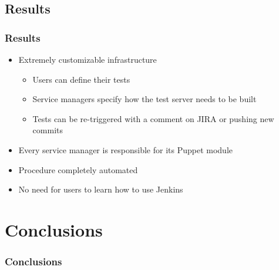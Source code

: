 \documentclass[aspectratio=169]{beamer}
\begin{document}

\subsection{Results}
\begin{frame}
    \frametitle{Results}
    \begin{itemize}
        \item Extremely customizable infrastructure
        \begin{itemize}
            \item Users can define their tests
            \item Service managers specify how the test server needs to be built
            \item Tests can be re-triggered with a comment on JIRA or pushing new commits
        \end{itemize}
        \item Every service manager is responsible for its Puppet module
        \item Procedure completely automated
        \item No need for users to learn how to use Jenkins
    \end{itemize}
\end{frame}

\section{Conclusions}

\begin{frame}
    \frametitle{Conclusions}
\end{frame}
\end{document}
